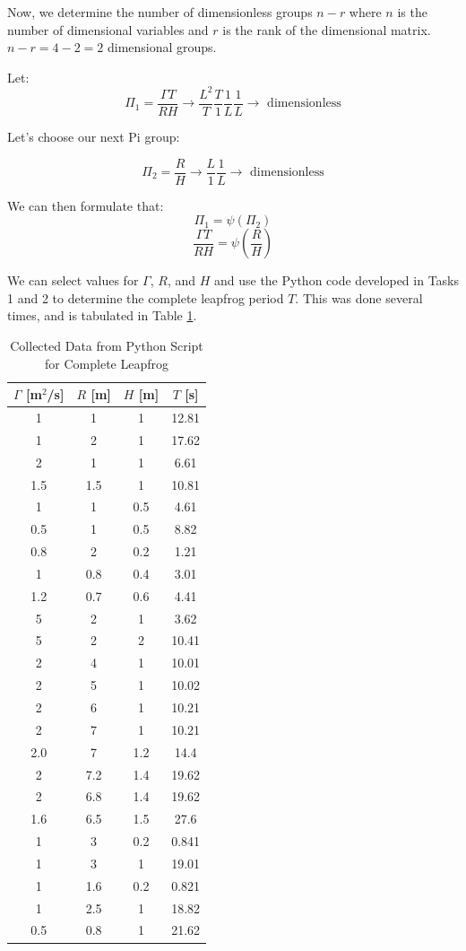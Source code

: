\documentclass[10pt]{article}
\begin{document}
Now, we determine the number of dimensionless groups $n-r$ where $n$ is the number of dimensional variables and $r$ is the rank of the dimensional matrix. $n-r=4-2=2$ dimensional groups.

Let:
\[\Pi_1=\frac{\Gamma T}{RH}\rightarrow\frac{L^2}{T}\frac{T}{1}\frac{1}{L}\frac{1}{L}\rightarrow \text{ dimensionless}\]

Let's choose our next Pi group:

\[\Pi_2=\frac{R}{H}\rightarrow \frac{L}{1}\frac{1}{L}\rightarrow \text{ dimensionless}\]

We can then formulate that:
\[\Pi_1=\psi(\Pi_2)\]
\[\frac{\Gamma T}{RH}=\psi\left(\frac{R}{H} \right)\]

We can select values for $\Gamma$, $R$, and $H$ and use the Python code developed in Tasks 1 and 2 to determine the complete leapfrog period $T$. This was done several times, and is tabulated in Table \ref{tab:data}.

\begin{table}[H]
    \centering
    \begin{tabular}{c c c c}
    $\Gamma$ [m$^2$/s]& $R$ [m]& $H$ [m]& $T$ [s] \\ \hline
    1 & 1 & 1 & 12.81 \\
    1 & 2 & 1 & 17.62 \\
    2 & 1 & 1 & 6.61 \\
    1.5 & 1.5 & 1 & 10.81 \\
    1 & 1 & 0.5 & 4.61 \\
    0.5 & 1 & 0.5 & 8.82 \\
    0.8 & 2 & 0.2 & 1.21 \\
    1 & 0.8 & 0.4 & 3.01 \\
    1.2 & 0.7 & 0.6 & 4.41 \\
    5 & 2 & 1 & 3.62 \\
    5 & 2 & 2 & 10.41 \\
    2 & 4 & 1 & 10.01 \\
    2 & 5 & 1 & 10.02 \\
    2 & 6 & 1 & 10.21 \\
    2 & 7 & 1 & 10.21 \\
    2.0 & 7 & 1.2 & 14.4 \\
    2 & 7.2 & 1.4 & 19.62 \\
    2 & 6.8 & 1.4 & 19.62 \\
    1.6 & 6.5 & 1.5 & 27.6 \\
    1 & 3 & 0.2 & 0.841 \\
    1 & 3 & 1 & 19.01 \\
    1 & 1.6 & 0.2 & 0.821 \\
    1 & 2.5 & 1 & 18.82 \\
    0.5 & 0.8 & 1 & 21.62 \\
    \end{tabular}
    \caption{Collected Data from Python Script for Complete Leapfrog}
    \label{tab:data}
\end{table}
\end{document}
